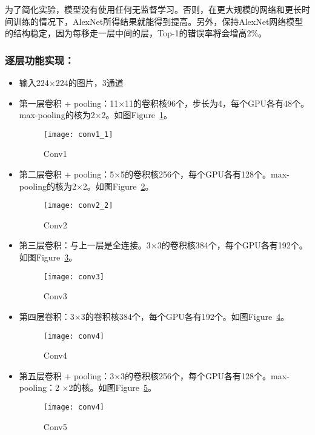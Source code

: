 为了简化实验，模型没有使用任何无监督学习。否则，在更大规模的网络和更长时间训练的情况下，AlexNet所得结果就能得到提高。另外，保持AlexNet网络模型的结构稳定，因为每移走一层中间的层，Top-1的错误率将会增高2\%。

\subsubsection{逐层功能实现：}
\begin{itemize}
\item 输入224$\times$224的图片，3通道
\item 第一层卷积 + pooling：11$\times$11的卷积核96个，步长为4，每个GPU各有48个。max-pooling的核为2$\times$2。如图Figure~\ref{fig:conv1}。
	\begin{figure}[!ht]
	\centering
	\texttt{[image: conv1\_1]}
	\caption{Conv1}
	\label{fig:conv1}
	\end{figure}
\end{itemize}

\begin{itemize}
\item 第二层卷积 + pooling：5$\times$5的卷积核256个，每个GPU各有128个。max-pooling的核为2$\times$2。如图Figure~\ref{fig:conv2}。
	\begin{figure}[!ht]
	\centering
	\texttt{[image: conv2\_2]}
	\caption{Conv2}
	\label{fig:conv2}
	\end{figure}
\end{itemize}

\begin{itemize}
\item 第三层卷积：与上一层是全连接。3$\times$3的卷积核384个，每个GPU各有192个。如图Figure~\ref{fig:conv3}。
	\begin{figure}[!ht]
	\centering
	\texttt{[image: conv3]}
	\caption{Conv3}
	\label{fig:conv3}
	\end{figure}
\item 第四层卷积：3$\times$3的卷积核384个，每个GPU各有192个。如图Figure~\ref{fig:conv4}。
	\begin{figure}[!ht]
	\centering
	\texttt{[image: conv4]}
	\caption{Conv4}
	\label{fig:conv4}
	\end{figure}
\item 第五层卷积 + pooling：3$\times$3的卷积核256个，每个GPU各有128个。max-pooling：2 $\times$2的核。如图Figure~\ref{fig:conv5}。
	\begin{figure}[!ht]
	\centering
	\texttt{[image: conv4]}
	\caption{Conv5}
	\label{fig:conv5}
	\end{figure}
\end{itemize}

